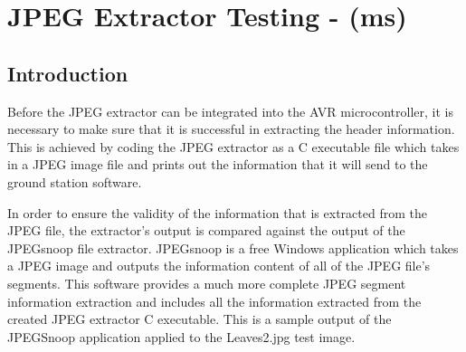\section{JPEG Extractor Testing - (ms)}

\subsection{Introduction}

Before the JPEG extractor can be integrated into the
AVR microcontroller, it is necessary to make sure that it is
successful in extracting the header information. This is 
achieved by coding the JPEG extractor as a C executable
file which takes in a JPEG image file and prints out the
information that it will send to the ground station software.

In order to ensure the validity of the information that is 
extracted from the JPEG file, the extractor's output is 
compared against the output of the JPEGsnoop file extractor. 
JPEGsnoop is a free Windows application which takes a 
JPEG image and outputs the information content of all 
of the JPEG file's segments. \cite{hass_impulse_jpeg} 
This software provides a much more 
complete JPEG segment  information extraction and 
includes all the information extracted from the 
created JPEG extractor C executable. This is a sample
output of the JPEGSnoop application applied to the
Leaves2.jpg test image.

